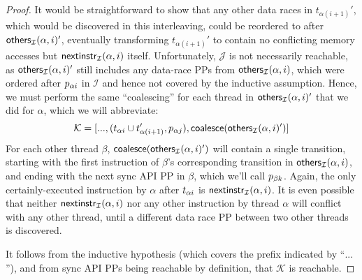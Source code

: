\begin{proof}
It would be straightforward to show that any other data races in $t_{\alpha{}(i+1)}'$, which would be discovered in this interleaving,
could be reordered to after $\mathsf{others}_{\mathcal{I}}(\alpha,i)'$,
eventually transforming $t_{\alpha{}(i+1)}'$ to contain no conflicting memory accesses but $\mathsf{nextinstr}_{\mathcal{I}}(\alpha,i)$ itself.
Unfortunately, $\mathcal{J}$ is not necessarily reachable, as $\mathsf{others}_{\mathcal{I}}(\alpha,i)'$ still includes any data-race PPs from $\mathsf{others}_{\mathcal{I}}(\alpha,i)$,
which were ordered after $p_{\alpha{}i}$ in $\mathcal{I}$ and hence not covered by the inductive assumption.
Hence, we must perform the same ``coalescing'' for each thread in $\mathsf{others}_{\mathcal{I}}(\alpha,i)'$ that we did for $\alpha$,
which we will abbreviate:
\[
	\mathcal{K} = [..., (t_{\alpha{}i} \cup t_{\alpha{}(i+1)}', p_{\alpha{}j}), \mathsf{coalesce}(\mathsf{others}_{\mathcal{I}}(\alpha,i)') ]
\]
For each other thread $\beta$, $\mathsf{coalesce}(\mathsf{others}_{\mathcal{I}}(\alpha,i)')$ will contain a single transition,
starting with the first instruction of $\beta$'s corresponding transition in $\mathsf{others}_{\mathcal{I}}(\alpha,i)$,
and ending with the next sync API PP in $\beta$, which we'll call $p_{\beta{}k}$.
Again, the only certainly-executed instruction by $\alpha$ after $t_{\alpha{}i}$ is $\mathsf{nextinstr}_{\mathcal{I}}(\alpha,i)$.
It is even possible that neither $\mathsf{nextinstr}_{\mathcal{I}}(\alpha,i)$ nor any other instruction by thread $\alpha$ will conflict with any other thread,
until a different data race PP between two other threads is discovered.

It follows from the inductive hypothesis (which covers the prefix indicated by ``$...$''),
and from sync API PPs being reachable by definition,
that $\mathcal{K}$ is reachable.


\end{proof}
